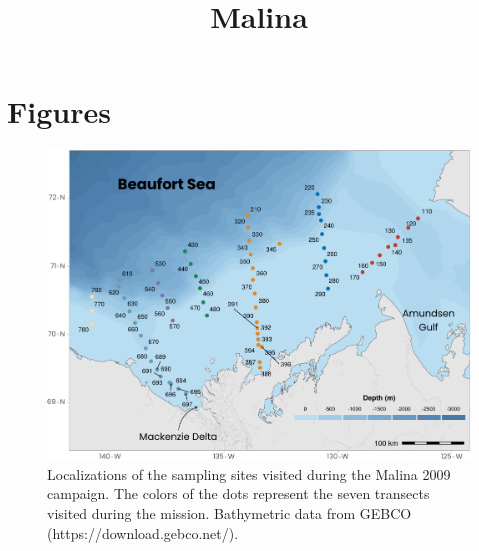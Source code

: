 \documentclass[essd, manuscript]{copernicus}
\begin{document}
\title{Malina}


    





\received{}
\pubdiscuss{} %
\revised{}
\accepted{}
\published{}



\maketitle

\begin{abstract}
\end{abstract}


\introduction  %


\section{Figures}

\begin{figure}[H]
	\centering
	\includegraphics[scale = 1]{../../../graphs/fig01.pdf}
	\caption{Localizations of the sampling sites visited during the Malina 2009 campaign. The colors of the dots represent the seven transects visited during the mission. Bathymetric data from GEBCO (https://download.gebco.net/).}
\end{figure}
\end{document}
